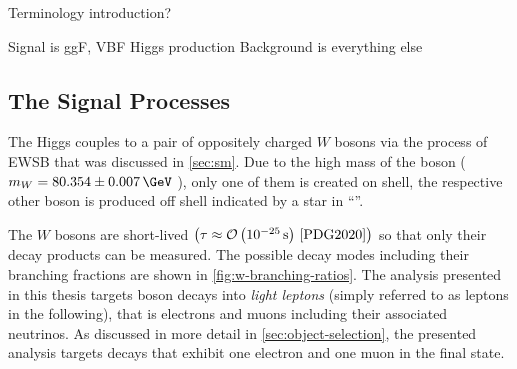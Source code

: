 Terminology introduction?

Signal is ggF, VBF Higgs production
Background is everything else

\subsection{The Signal Processes}
\label{subsec:signal-bkg-characterisation}
The Higgs couples to a pair of oppositely charged $W$ bosons via the process of EWSB that was discussed in \cref{sec:sm}. Due to the high mass of the \Wboson boson ($m_W = 80.354 \pm 0.007\,\GeV$ \cite{PDG2020}), only one of them is created on shell, the respective other boson is produced off shell indicated by a star in ``\HWW''.

The $W$ bosons are short-lived $\left( \tau \approx \mathcal{O}\left(10^{-25}\,\text{s}\right)\,\text{\cite{PDG2020}}  \right)$ so that only their decay products can be measured. The possible decay modes including their branching fractions are shown in \cref{fig:w-branching-ratios}. The analysis presented in this thesis targets \Wboson boson decays into \emph{light leptons} (simply referred to as leptons in the following), that is electrons and muons including their associated neutrinos.
As discussed in more detail in \cref{sec:object-selection}, the presented analysis targets \HWW decays that exhibit one electron and one muon in the final state.


